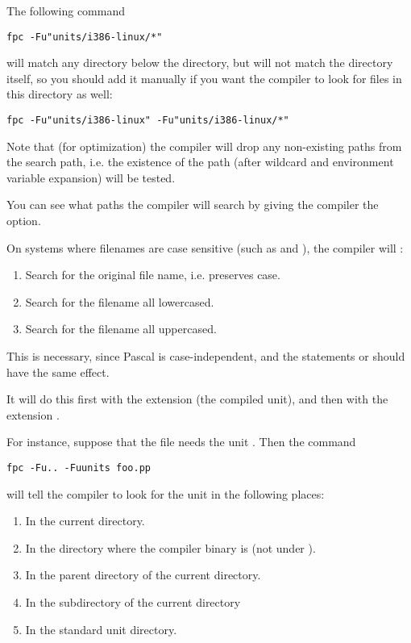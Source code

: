 The following command
\begin{verbatim}
fpc -Fu"units/i386-linux/*"
\end{verbatim}
will match any directory below the  directory, 
but will not match the  directory itself, so
you should add it manually if you want the compiler to look for files
in this directory as well:
\begin{verbatim}
fpc -Fu"units/i386-linux" -Fu"units/i386-linux/*"
\end{verbatim}

Note that (for optimization) the compiler will drop any non-existing paths 
from the search path, i.e. the existence of the path (after wildcard and
environment variable expansion) will be tested.

You can see what paths the compiler will search by giving the compiler
the  option.

On systems where filenames are case sensitive (such as \unix and \linux), 
the compiler will :
\begin{enumerate}
\item Search for the original file name, i.e. preserves case.
\item Search for the filename all lowercased.
\item Search for the filename all uppercased.
\end{enumerate}
This is necessary, since Pascal is case-independent, and the statements 
 or  should have the same effect.

It will do this first with the extension  (the compiled unit),
 and then with the extension .

For instance, suppose that the file  needs the unit
. Then the command
\begin{verbatim}
fpc -Fu.. -Fuunits foo.pp
\end{verbatim}
will tell the compiler to look for the unit  in the following
places:
\begin{enumerate}
\item In the current directory.
\item In the directory where the compiler binary is (not under \linux).
\item In the parent directory of the current directory.
\item In the subdirectory  of the current directory
\item In the standard unit directory.
\end{enumerate}

